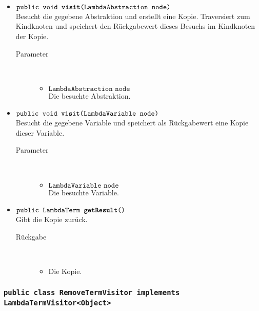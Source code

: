 \begin{description}
\begin{itemize}
		\item $\texttt{public void \textbf{visit}(LambdaAbstraction node)}$ \\ Besucht die gegebene Abstraktion und erstellt eine Kopie. Traversiert zum Kindknoten und speichert den Rückgabewert dieses Besuchs im Kindknoten der Kopie.
		\begin{description}
			\item[Parameter] \hfill \\
			\vspace{-.8cm}
			\begin{itemize}
				\item $\texttt{LambdaAbstraction node}$ \\ Die besuchte Abstraktion.
			\end{itemize}
		\end{description}
		
		\item $\texttt{public void \textbf{visit}(LambdaVariable node)}$ \\ Besucht die gegebene Variable und speichert als Rückgabewert eine Kopie dieser Variable.
		\begin{description}
			\item[Parameter] \hfill \\
			\vspace{-.8cm}
			\begin{itemize}
				\item $\texttt{LambdaVariable node}$ \\ Die besuchte Variable.
			\end{itemize}
		\end{description}
		
		\item $\texttt{public LambdaTerm \textbf{getResult}()}$ \\ Gibt die Kopie zurück.
		\begin{description}
			\item[Rückgabe] \hfill \\
			\vspace{-.8cm}
			\begin{itemize}
				\item Die Kopie.
			\end{itemize}
		\end{description}
	\end{itemize}
\end{description}

\subsubsection{\normalfont \texttt{public class \textbf{RemoveTermVisitor} implements LambdaTermVisitor<Object>}}

